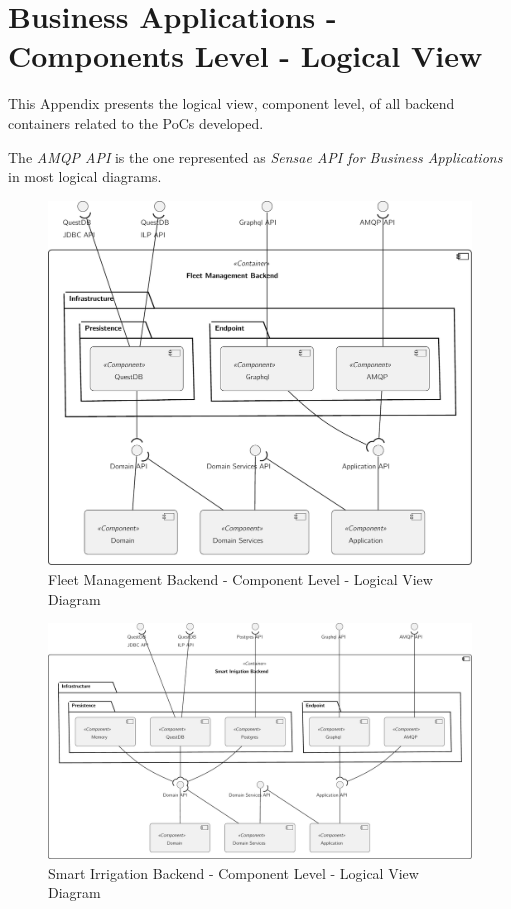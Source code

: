 \chapter{Business Applications - Components Level - Logical View}
\label{AppendixC2}

This Appendix presents the logical view, component level, of all backend containers related to the \gls{PoC}s developed.

The \textit{AMQP API} is the one represented as \textit{Sensae API for Business Applications} in most logical diagrams.

\begin{figure}[H]
   \centering
   \includegraphics[page=1,width=0.8\columnwidth]{assets/diagrams/design/architectural/level3/logical/fleet-management-backend.pdf}
   \caption[Fleet Management Backend - Component Level - Logical View Diagram]{Fleet Management Backend - Component Level - Logical View Diagram}
   \label{fig:AppendixC2:fleet}
\end{figure}

\begin{figure}[H]
   \centering
   \includegraphics[page=1,width=\columnwidth]{assets/diagrams/design/architectural/level3/logical/smart-irrigation-backend.pdf}
   \caption[Smart Irrigation Backend - Component Level - Logical View Diagram]{Smart Irrigation Backend - Component Level - Logical View Diagram}
   \label{fig:AppendixC2:irrig}
\end{figure}

